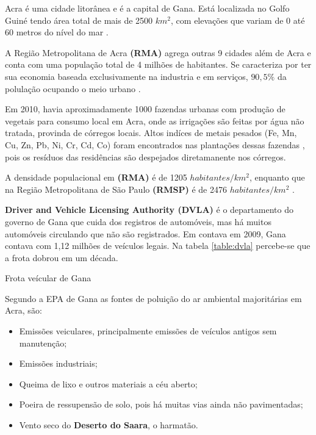 Acra é uma cidade litorânea e é a capital de Gana. Está localizada 
no Golfo Guiné tendo área total de mais de 2500 $km^2$, com elevações que 
variam de 0 até 60 metros do nível do mar \citep{ARKU2008}.

A Região Metropolitana de Acra \textbf{(RMA)} agrega outras 9 cidades
além de Acra e conta com uma população total de 4 milhões de habitantes. 
Se caracteriza por ter sua economia baseada exclusivamente na industria 
e em serviços, $90,5\%$ da polulação ocupando o meio urbano \citep{ghanacensus2013}.

Em 2010, havia aproximadamente 1000 fazendas urbanas com produção de vegetais 
para consumo local em Acra, onde as irrigações são feitas por água não tratada, 
provinda de córregos locais. Altos indíces de metais pesados 
(Fe, Mn, Cu, Zn, Pb, Ni, Cr, Cd, Co) foram encontrados nas plantações 
dessas fazendas \citep{lente2014}, pois os resíduos das residências são despejados 
diretamanente nos córregos.

A densidade populacional em \textbf{(RMA)} é de 1205 $habitantes/km^2$, 
enquanto que na Região Metropolitana de São Paulo \textbf{(RMSP)} é de 
2476 $habitantes/km^2$ \citep{ibge2011}. 

\textbf{Driver and Vehicle Licensing Authority (DVLA)} é o
departamento do governo de Gana que cuida dos registros de automóveis, 
mas há muitos automóveis circulando que não são registrados. 
Em contava em 2009, Gana contava com 1,12 milhões de veículos legais. 
Na tabela \ref{table:dvla} percebe-se que a frota dobrou em um década.

\begin{table}[H]
 \centering
  
  \caption{Frota veícular de Gana \citep{dvla} \label{table:dvla}}
\end{table}

Segundo a EPA de Gana \citep{epagh} as fontes de poluição do ar ambiental 
majoritárias em Acra, são:

\begin{itemize}
  \item Emissões veiculares, principalmente emissões de veículos antigos sem manutenção;
  \item Emissões industriais;
  \item Queima de lixo e outros materiais a céu aberto;
  \item Poeira de ressupensão de solo, pois há muitas vias ainda não pavimentadas;
  \item Vento seco do \textbf{Deserto do Saara}, o harmatão.
\end{itemize}

